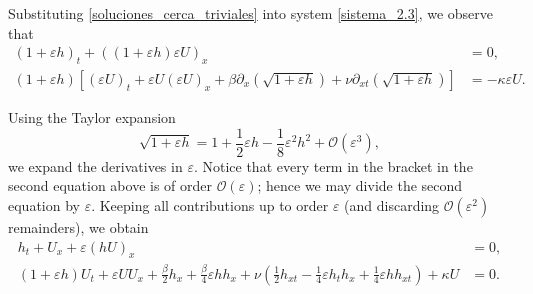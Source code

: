 \documentclass[reqno]{amsart}
\theoremstyle{definition}
\numberwithin{equation}{section}
\numberwithin{theorem}{section}
\numberwithin{definition}{section}
\begin{document}
Substituting \eqref{soluciones_cerca_triviales} into system \eqref{sistema_2.3}, we observe that
\begin{subequations}
    \begin{align*}
        (1 + \varepsilon h)_t + ((1 + \varepsilon h)\varepsilon U)_x &= 0,\\
        (1 + \varepsilon h)\left[(\varepsilon U)_t + \varepsilon U (\varepsilon U)_x + \beta\partial_x\left(\sqrt{1 + \varepsilon h}\right)+\nu \partial_{xt}\left(\sqrt{1+ \varepsilon h }\right)\right]&=-\kappa \varepsilon U.
    \end{align*}
\end{subequations}

Using the Taylor expansion
\begin{equation*}
	\sqrt{1 + \varepsilon h}
	= 1+ \frac{1}{2} \varepsilon  h -\frac{1}{8} \varepsilon^2h^2 +\mathcal{O}( \varepsilon^3),
\end{equation*}
we expand the derivatives in $\varepsilon$. Notice that every term in the bracket in the second equation above is of order
$\mathcal{O}(\varepsilon)$; hence we may divide the second equation by $\varepsilon$.
Keeping all contributions up to order $\varepsilon$ (and discarding $\mathcal{O}(\varepsilon^2)$ remainders), we obtain
\begin{subequations}
	\begin{align*}
		h_t +  U_x + \varepsilon(hU)_x &=0,\\
		(1+\varepsilon h)U_t +\varepsilon UU_x + \frac{\beta}{2} h_x + \frac{\beta}{4}\varepsilon hh_x
		+  \nu \left(\frac{1}{2} h_{xt} - \frac{1}{4}\varepsilon h_th_x + \frac{1}{4}\varepsilon hh_{xt}\right)+\kappa U&=0.
	\end{align*}
\end{subequations}
\end{document}
